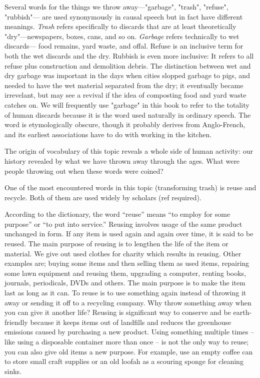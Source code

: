Several words for the things we throw away---"garbage", "trash", "refuse", "rubbish"--- are used synonymously in causal speech but in fact have different meanings. \textit{Trash} refers specifically to discards that are at least theoretically "dry"---newspapers, boxes, cans, and so on. \textit{Garbage} refers technically to wet discards--- food remains, yard waste, and offal. Refuse is an inclusive term for both the wet discards and the dry. Rubbish is even more inclusive: It refers to all refuse plus construction and demolition debris. The distinction between wet and dry garbage was important in the days when cities slopped garbage to pigs, and needed to have the wet material separated from the dry; it eventually became irrevelant, but may see a revival if the idea of composting food and yard waste catches on. We will frequently use "garbage" in this book to refer to the totality of human discards because it is the word used naturally in ordinary speech. The word is etymologically obscure, though it probably derives from Anglo-French, and its earliest associations have to do with working in the kitchen.

The origin of vocabulary of this topic reveals a whole side of human activity: our history revealed by what we have thrown away through the ages. What were people throwing out when these words were coined? 

One of the most encountered words in this topic (transforming trash) is reuse and recycle. Both of them are used widely by scholars (ref required).

According to the dictionary, the word “reuse” means “to employ for some purpose” or “to put into service.” Reusing involves usage of the same product unchanged in form. If any item is used again and again over time, it is said to be reused. The main purpose of reusing is to lengthen the life of the item or material. We give out used clothes for charity which results in reusing. Other examples are; buying some items and then selling them as used items, repairing some lawn equipment and reusing them, upgrading a computer, renting books, journals, periodicals, DVDs and others. The main purpose is to make the item last as long as it can. To reuse is to use something again instead of throwing it away or sending it off to a recycling company. Why throw something away when you can give it another life? Reusing is significant way to conserve and be earth-friendly because it keeps items out of landfills and reduces the greenhouse emissions caused by purchasing a new product. Using something multiple times -- like using a disposable container more than once -- is not the only way to reuse; you can also give old items a new purpose. For example, use an empty coffee can to store small craft supplies or an old loofah as a scouring sponge for cleaning sinks.

